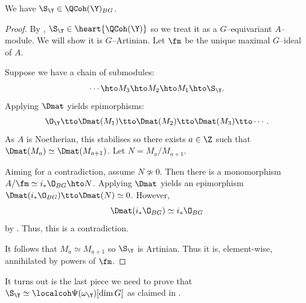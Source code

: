 \documentclass{amsart}
\begin{document}
  \begin{lem}\label{lem:supp_s}
    We have \(\S_\Y \in \QCoh(\Y)_{BG}\).
  \end{lem}
  \begin{proof}
    By , \(\S_\Y \in \heart{\QCoh(\Y)}\)
    so we treat it as a \(G\)--equivariant \(A\)--module. 
    We will show it is \(G\)--Artinian.
    Let
    \(\fm\) be the unique maximal \(G\)--ideal of \(A\).

     Suppose we have a chain of submodules:
    \begin{displaymath}
      \cdots \hto M_3 \hto M_2  \hto M_1 \hto \S_\Y.
    \end{displaymath}
    Applying \(\Dmat\) yields epimorphisms:
    \begin{displaymath}
      \O_\Y \tto \Dmat(M_1) \tto \Dmat(M_2) \tto \Dmat(M_3) \tto \cdots.
    \end{displaymath}
    As \(A\) is Noetherian, this stabilises so there exists \(a \in \Z\) such that
    \(\Dmat(M_a) \simeq \Dmat(M_{a+1})\).
    Let \(N = M_a/M_{a+1}\). 

    Aiming for a contradiction, assume \(N \not\simeq 0\).
    Then there is a monomorphism \(A/\fm \simeq i_\ast \O_{BG} \hto N\).
    Applying \(\Dmat\) yields an epimorphism \(\Dmat(i_\ast \O_{BG}) \tto \Dmat(N) \simeq 0\).
    However,
    \begin{displaymath}
      \Dmat(i_\ast \O_{BG}) \simeq i_\ast \O_{BG}
    \end{displaymath}
    by . Thus, this is a contradiction.

    It follows that \(M_a \simeq M_{a+1}\) so
    \(\S_\Y\) is Artinian. Thus it is, element-wise,
    annihilated by powers of \(\fm\).
  \end{proof}

  \sssec{}

  It turns out  is the last piece we need to prove
  that \(\S_\Y \simeq \localcoh \Psi(\omega_\Y)[\dim G]\) as claimed in .
\end{document}
